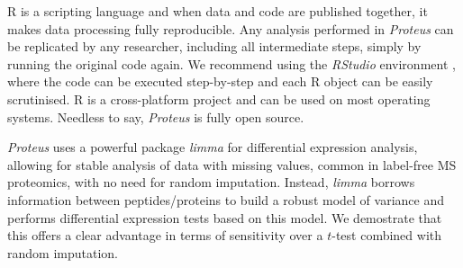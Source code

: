 \documentclass[]{article}
\begin{document}
R is a scripting language and when data and code are published together,
it makes data processing fully reproducible. Any analysis performed in
\emph{Proteus} can be replicated by any researcher, including all
intermediate steps, simply by running the original code again. We
recommend using the \emph{RStudio} environment \citep{rstudio}, where
the code can be executed step-by-step and each R object can be easily
scrutinised. R is a cross-platform project and can be used on most
operating systems. Needless to say, \emph{Proteus} is fully open source.

\emph{Proteus} uses a powerful package \emph{limma} for differential
expression analysis, allowing for stable analysis of data with missing
values, common in label-free MS proteomics, with no need for random
imputation. Instead, \emph{limma} borrows information between
peptides/proteins to build a robust model of variance and performs
differential expression tests based on this model. We demostrate that
this offers a clear advantage in terms of sensitivity over a \(t\)-test
combined with random imputation.

\renewcommand\refname{References}

\end{document}
